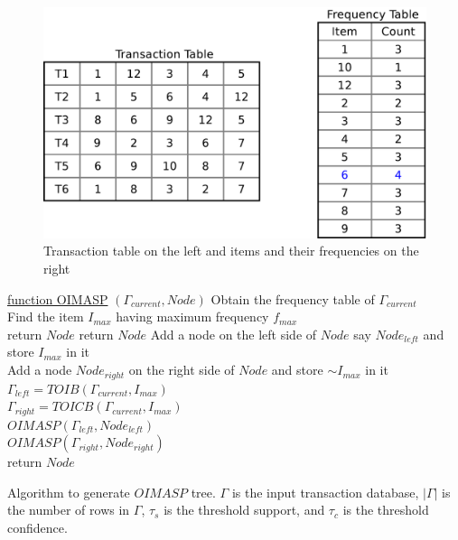 \documentclass[review]{elsarticle}
\begin{document}
\begin{figure}
\begin{center}
\includegraphics[scale=0.3]{pdf/itemfreq}
\end{center}
\caption{Transaction table on the left and items and their frequencies on the right}
\label{Fig 5}
\end{figure}

\begin{algorithm}

    \underline{function OIMASP} $ (\Gamma_{current}, Node) $\;
    Obtain the frequency table of $ \Gamma_{current} $\\
    Find the item $ I_{max} $ having maximum frequency $ f_{max} $\\
      {
        return $ Node $
      }     
      {
        return $ Node $
      }
    Add a node on the left side of $ Node $ say $ Node_{left} $ and store $ I_{max} $ in it\\
    
    Add a node $ Node_{right} $ on the right side of $ Node $ and store  $ \sim I_{max} $ in it\\
    
    $ \Gamma_{left} = TOIB(\Gamma_{current}, I_{max}) $\\
    $ \Gamma_{right} = TOICB(\Gamma_{current}, I_{max}) $\\
    
    $ OIMASP(\Gamma_{left}, Node_{left}) $\\
    $ OIMASP(\Gamma_{right}, Node_{right}) $\\
    return $ Node $
    \caption{Algorithm to generate $ OIMASP $ tree. $ \Gamma $ is the input transaction database, $ \vert \Gamma \vert $ is the number of rows in $ \Gamma $, $ \tau_{s} $ is the threshold support, and $ \tau_{c} $ is the threshold confidence.}
\end{algorithm}
\end{document}
